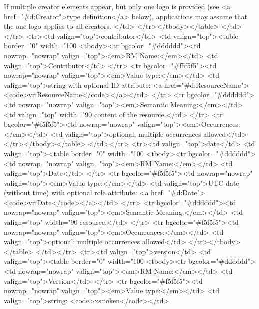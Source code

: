 \documentclass[11pt,a4paper]{ivoa}
\begin{document}
                  If multiple creator elements appear, but only one
                  logo is provided (see <a href="#d:Creator">type
                  definition</a> below), applications may assume that
                  the one logo applies to all creators.  </td> 
          </tr></tbody></table>
      </td></tr>
  <tr><td valign="top">contributor</td>
      <td valign="top"><table border="0" width="100%
          <tbody><tr bgcolor="#dddddd"><td nowrap="nowrap" valign="top"><em>RM Name:</em></td>
              <td valign="top">Contributor</td>
          </tr>
          <tr bgcolor="#f5f5f5"><td nowrap="nowrap" valign="top"><em>Value type:</em></td>
              <td valign="top">string with optional ID attribute: <a href="#d:ResourceName"><code>vr:ResourceName</code></a></td>
          </tr>
          <tr bgcolor="#dddddd"><td nowrap="nowrap" valign="top"><em>Semantic Meaning:</em></td>
              <td valign="top" width="90%
               content of the resource.</td> 
          </tr>
          <tr bgcolor="#f5f5f5"><td nowrap="nowrap" valign="top"><em>Occurrences:</em></td>
              <td valign="top">optional; multiple occurrences allowed</td>
          </tr></tbody></table>
      </td></tr>
  <tr><td valign="top">date</td>
      <td valign="top"><table border="0" width="100%
          <tbody><tr bgcolor="#dddddd"><td nowrap="nowrap" valign="top"><em>RM Name:</em></td>
              <td valign="top">Date</td>
          </tr>
          <tr bgcolor="#f5f5f5"><td nowrap="nowrap" valign="top"><em>Value type:</em></td>
              <td valign="top">UTC date (without time) with optional role attribute: <a href="#d:Date"><code>vr:Date</code></a></td>
          </tr>
          <tr bgcolor="#dddddd"><td nowrap="nowrap" valign="top"><em>Semantic Meaning:</em></td>
              <td valign="top" width="90%
               resource.</td> 
          </tr>
          <tr bgcolor="#f5f5f5"><td nowrap="nowrap" valign="top"><em>Occurrences:</em></td>
              <td valign="top">optional; multiple occurrences allowed</td>
          </tr></tbody></table>
      </td></tr>
  <tr><td valign="top">version</td>
      <td valign="top"><table border="0" width="100%
          <tbody><tr bgcolor="#dddddd"><td nowrap="nowrap" valign="top"><em>RM Name:</em></td>
              <td valign="top">Version</td>
          </tr>
          <tr bgcolor="#f5f5f5"><td nowrap="nowrap" valign="top"><em>Value type:</em></td>
              <td valign="top">string: <code>xs:token</code></td>
\end{document}
